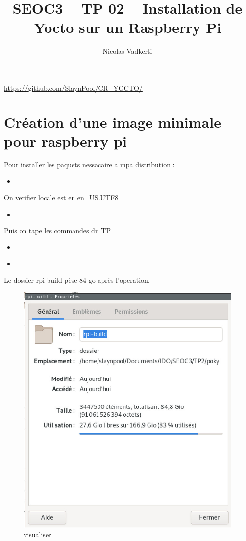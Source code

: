 \documentclass[10pt,a4paper]{article}
\title{SEOC3 – TP 02 – Installation de Yocto sur un Raspberry Pi}
\author{Nicolas Vadkerti}
\newcommand{\insertcode}[2]{\begin{itemize}\item[]\end{itemize}}
\begin{document}
\maketitle


\url{https://github.com/SlaynPool/CR_YOCTO/}


\section{Création d’une image minimale pour raspberry pi }
Pour installer les paquets nessacaire a mpa distribution :
\insertcode{commande/1.txt}{Installation des paquets pour ma distribution}
 
On verifier locale est en en\_US.UTF8


\insertcode{commande/2.txt}{Mes Locale}
Puis on tape les commandes du TP 

\insertcode{commande/3.txt}{On tape les commandes}

 \insertcode{commande/4.txt}{Fini de la commande bitbake}
 
 
 Le dossier rpi-build pèse 84 go après l'operation.
 
 
   \begin{figure}[h!]
\centering
\includegraphics[scale=0.50]{screen/1.jpg}
\caption{visualiser}
\label{fig:qos}
\end{figure}
\end{document}
